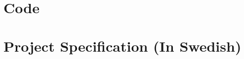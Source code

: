 \documentclass[12pt,twoside]{kau_report}
\begin{document}
%


\section{Code}
\label{app:code}

\cleardoublepage

\section{Project Specification (In Swedish)}
\label{app:projectspec}
%
%
\end{document}
